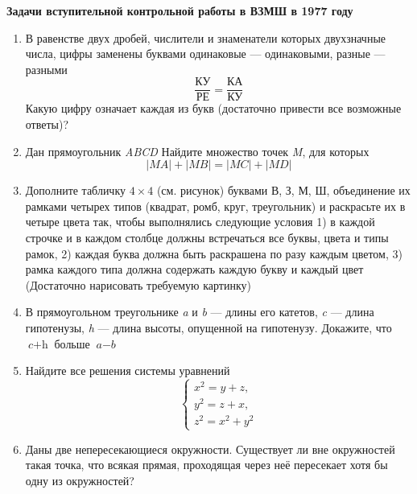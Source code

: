     \raggedcolumns %
    
    \begin{multicols}{2} %
        \noindent \textbf{\LARGE Задачи вступительной контрольной работы в ВЗМШ в 1977 году} \\
        
        \begin{enumerate}[itemsep=0pt, wide=0pt, itemindent=3em] %
            \item В равенстве двух дробей, числители и знаменатели которых двухзначные числа, цифры заменены буквами одинаковые --- одинаковыми, разные --- разными
            \[\frac{\textit{КУ}}{\textit{РЕ}} = \frac{\textit{КА}}{\textit{КУ}}\]
            \hspace* {3mm} Какую цифру означает каждая из букв (достаточно привести все возможные ответы)?\setlength{\parindent}{1.5em}
            \item Дан прямоугольник \textit{ABCD} Найдите множество точек \textit{M}, для которых
            \[|\textit{MA}|+|\textit{MB}| = |\textit{MC}| + |\textit{MD}|\]
            \item Дополните табличку $4\times4$ (см. рисунок) буквами В, З, М, Ш, объединение их рамками четырех типов (квадрат, ромб, круг, треугольник) и раскрасьте их в четыре цвета так, чтобы выполнялись следующие условия 1) в каждой строчке и в каждом столбце должны встречаться все буквы, цвета и типы рамок, 2) каждая буква должна быть раскрашена по разу каждым цветом, 3) рамка каждого типа должна содержать каждую букву и каждый цвет (Достаточно нарисовать требуемую картинку)
            \item В прямоугольном треугольнике \textit{a} и \textit{b} --- длины его катетов, \textit{c} --- длина гипотенузы, \textit{h} --- длина высоты, опущенной на гипотенузу. Докажите, что $\textit{c} + \textit{h}$ больше $\textit{a} - \textit{b}$
            \item Найдите все решения системы уравнений
            \[
            \begin{cases}
                x^2 = y + z,\\
                y^2 = z + x,\\
                z^2 = x^2 + y^2
            \end{cases}
            \]
            \item Даны две непересекающиеся окружности. Существует ли вне окружностей такая точка, что всякая прямая, проходящая через неё пересекает хотя бы одну из окружностей?\\

\end{enumerate}
\end{multicols}
